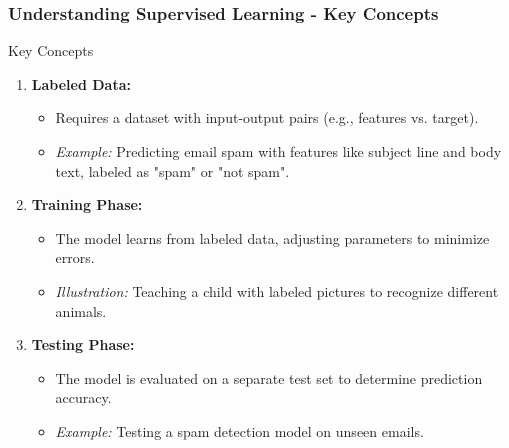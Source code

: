 \documentclass[aspectratio=169]{beamer}
\begin{document}
\begin{frame}[fragile]
    \frametitle{Understanding Supervised Learning - Key Concepts}
    \begin{block}{Key Concepts}
        \begin{enumerate}
            \item \textbf{Labeled Data:}
            \begin{itemize}
                \item Requires a dataset with input-output pairs (e.g., features vs. target).
                \item \textit{Example:} Predicting email spam with features like subject line and body text, labeled as "spam" or "not spam".
            \end{itemize}
        
            \item \textbf{Training Phase:}
            \begin{itemize}
                \item The model learns from labeled data, adjusting parameters to minimize errors.
                \item \textit{Illustration:} Teaching a child with labeled pictures to recognize different animals.
            \end{itemize}
        
            \item \textbf{Testing Phase:}
            \begin{itemize}
                \item The model is evaluated on a separate test set to determine prediction accuracy.
                \item \textit{Example:} Testing a spam detection model on unseen emails.
            \end{itemize}
        \end{enumerate}
    \end{block}
\end{frame}
\end{document}
